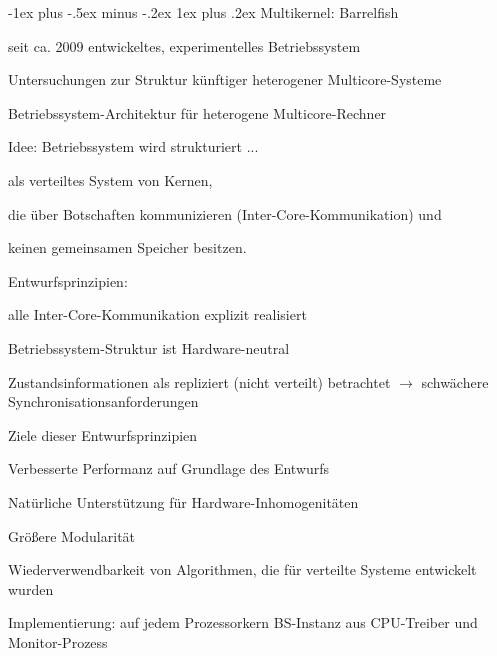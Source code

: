 \documentclass[a4paper]{article}
\makeatletter
\renewcommand{\subsubsection}{\@startsection{subsubsection}{3}{0mm}%
 {-1ex plus -.5ex minus -.2ex}%
 {1ex plus .2ex}%
 {\normalfont\small\bfseries}}
\makeatother
\begin{document}
\begin{multicols}{3}
    \subsubsection{Multikernel: Barrelfish}
    \begin{itemize*}
        \item seit ca. 2009 entwickeltes, experimentelles Betriebssystem
        \item Untersuchungen zur Struktur künftiger heterogener Multicore-Systeme
        \item Betriebssystem-Architektur für heterogene Multicore-Rechner
        \begin{itemize*}
            \item Idee: Betriebssystem wird strukturiert ...
            \begin{itemize*}
                \item als verteiltes System von Kernen,
                \item die über Botschaften kommunizieren (Inter-Core-Kommunikation) und
                \item keinen gemeinsamen Speicher besitzen.
            \end{itemize*}
            \item Entwurfsprinzipien:
            \begin{enumerate*}
                \item alle Inter-Core-Kommunikation explizit realisiert %
                \item Betriebssystem-Struktur ist Hardware-neutral
                \item Zustandsinformationen als repliziert (nicht verteilt) betrachtet $\rightarrow$ schwächere Synchronisationsanforderungen
            \end{enumerate*}
            \item Ziele dieser Entwurfsprinzipien
            \begin{enumerate*}
                \item Verbesserte Performanz auf Grundlage des Entwurfs %
                \item Natürliche Unterstützung für Hardware-Inhomogenitäten
                \item Größere Modularität
                \item Wiederverwendbarkeit von Algorithmen, die für verteilte Systeme entwickelt wurden
            \end{enumerate*}
            \item Implementierung: auf jedem Prozessorkern BS-Instanz aus CPU-Treiber und Monitor-Prozess
        \end{itemize*}
    \end{itemize*}


\end{multicols}
\end{document}
